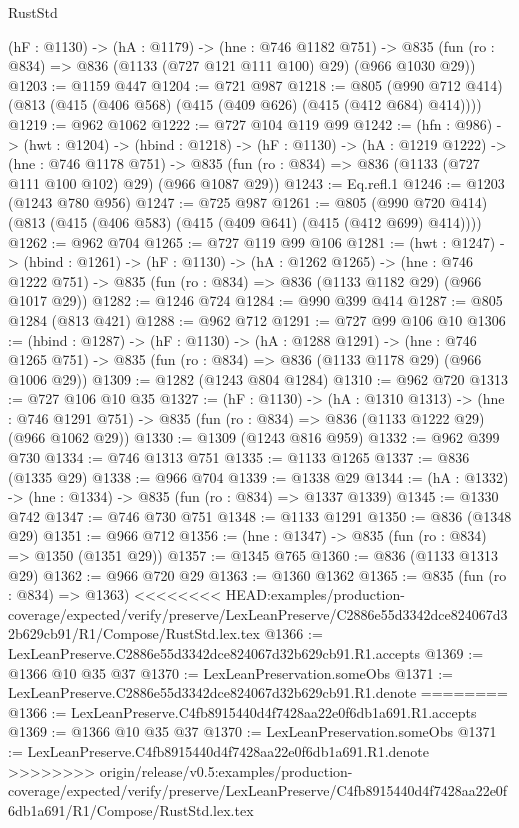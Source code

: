\begin{lexlean}{RustStd}
\begin{coremodule}
{\begin{coremodule}
  (hF : @1130) ->
  (hA : @1179) ->
  (hne : @746 @1182 @751) ->
  @835 (fun (ro : @834) => @836 (@1133 (@727 @121 @111 @100) @29) (@966 @1030 @29))
@1203 := @1159 @447
@1204 := @721 @987
@1218 := @805 (@990 @712 @414) (@813 (@415 (@406 @568) (@415 (@409 @626) (@415 (@412 @684) @414))))
@1219 := @962 @1062
@1222 := @727 @104 @119 @99
@1242 := (hfn : @986) ->
  (hwt : @1204) ->
  (hbind : @1218) ->
  (hF : @1130) ->
  (hA : @1219 @1222) ->
  (hne : @746 @1178 @751) ->
  @835 (fun (ro : @834) => @836 (@1133 (@727 @111 @100 @102) @29) (@966 @1087 @29))
@1243 := Eq.refl.{1}
@1246 := @1203 (@1243 @780 @956)
@1247 := @725 @987
@1261 := @805 (@990 @720 @414) (@813 (@415 (@406 @583) (@415 (@409 @641) (@415 (@412 @699) @414))))
@1262 := @962 @704
@1265 := @727 @119 @99 @106
@1281 := (hwt : @1247) ->
  (hbind : @1261) ->
  (hF : @1130) ->
  (hA : @1262 @1265) ->
  (hne : @746 @1222 @751) -> @835 (fun (ro : @834) => @836 (@1133 @1182 @29) (@966 @1017 @29))
@1282 := @1246 @724
@1284 := @990 @399 @414
@1287 := @805 @1284 (@813 @421)
@1288 := @962 @712
@1291 := @727 @99 @106 @10
@1306 := (hbind : @1287) ->
  (hF : @1130) ->
  (hA : @1288 @1291) ->
  (hne : @746 @1265 @751) -> @835 (fun (ro : @834) => @836 (@1133 @1178 @29) (@966 @1006 @29))
@1309 := @1282 (@1243 @804 @1284)
@1310 := @962 @720
@1313 := @727 @106 @10 @35
@1327 := (hF : @1130) ->
  (hA : @1310 @1313) ->
  (hne : @746 @1291 @751) -> @835 (fun (ro : @834) => @836 (@1133 @1222 @29) (@966 @1062 @29))
@1330 := @1309 (@1243 @816 @959)
@1332 := @962 @399 @730
@1334 := @746 @1313 @751
@1335 := @1133 @1265
@1337 := @836 (@1335 @29)
@1338 := @966 @704
@1339 := @1338 @29
@1344 := (hA : @1332) -> (hne : @1334) -> @835 (fun (ro : @834) => @1337 @1339)
@1345 := @1330 @742
@1347 := @746 @730 @751
@1348 := @1133 @1291
@1350 := @836 (@1348 @29)
@1351 := @966 @712
@1356 := (hne : @1347) -> @835 (fun (ro : @834) => @1350 (@1351 @29))
@1357 := @1345 @765
@1360 := @836 (@1133 @1313 @29)
@1362 := @966 @720 @29
@1363 := @1360 @1362
@1365 := @835 (fun (ro : @834) => @1363)
<<<<<<<< HEAD:examples/production-coverage/expected/verify/preserve/LexLeanPreserve/C2886e55d3342dce824067d32b629cb91/R1/Compose/RustStd.lex.tex
@1366 := LexLeanPreserve.C2886e55d3342dce824067d32b629cb91.R1.accepts
@1369 := @1366 @10 @35 @37
@1370 := LexLeanPreservation.someObs
@1371 := LexLeanPreserve.C2886e55d3342dce824067d32b629cb91.R1.denote
========
@1366 := LexLeanPreserve.C4fb8915440d4f7428aa22e0f6db1a691.R1.accepts
@1369 := @1366 @10 @35 @37
@1370 := LexLeanPreservation.someObs
@1371 := LexLeanPreserve.C4fb8915440d4f7428aa22e0f6db1a691.R1.denote
>>>>>>>> origin/release/v0.5:examples/production-coverage/expected/verify/preserve/LexLeanPreserve/C4fb8915440d4f7428aa22e0f6db1a691/R1/Compose/RustStd.lex.tex

\end{coremodule}}
\end{coremodule}
\end{lexlean}
